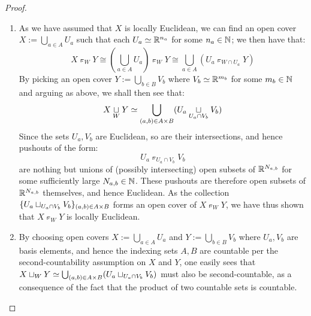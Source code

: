             \begin{proof}
                \begin{enumerate}
                    \item As we have assumed that $X$ is locally Euclidean, we can find an open cover $X := \bigcup_{a \in A} U_a$ such that each $U_a \simeq \mathbb{R}^{n_a}$ for some $n_a \in \mathbb{N}$; we then have that:
                        $$X \pushout_W Y \cong ( \bigcup_{a \in A} U_a ) \pushout_W Y \cong \bigcup_{a \in A} ( U_a \pushout_{W \cap U_a} Y )$$
                    By picking an open cover $Y := \bigcup_{b \in B} V_b$ where $V_b \simeq \mathbb{R}^{m_b}$ for some $m_b \in \mathbb{N}$ and arguing as above, we shall then see that:
                        $$X \pushout_W Y \cong \bigcup_{(a, b) \in A \x B} (U_a \pushout_{U_a \cap V_b} V_b)$$
                    Since the sets $U_a, V_b$ are Euclidean, so are their intersections, and hence pushouts of the form:
                        $$U_a \pushout_{U_a \cap V_b} V_b$$
                    are nothing but unions of (possibly intersecting) open subsets of $\mathbb{R}^{N_{a, b}}$ for some sufficiently large $N_{a, b} \in \mathbb{N}$. These pushouts are therefore open subsets of $\mathbb{R}^{N_{a, b}}$ themselves, and hence Euclidean. As the collection $\{ U_a \pushout_{U_a \cap V_b} V_b \}_{(a, b) \in A \x B}$ forms an open cover of $X \pushout_W Y$, we have thus shown that $X \pushout_W Y$ is locally Euclidean.
                    \item By choosing open covers $X := \bigcup_{a \in A} U_a$ and $Y := \bigcup_{b \in B} V_b$ where $U_a, V_b$ are basis elements, and hence the indexing sets $A, B$ are countable per the second-countability assumption on $X$ and $Y$, one easily sees that $X \pushout_W Y \cong \bigcup_{(a, b) \in A \x B} (U_a \pushout_{U_a \cap V_b} V_b)$ must also be second-countable, as a consequence of the fact that the product of two countable sets is countable.
                \end{enumerate}
            \end{proof}

